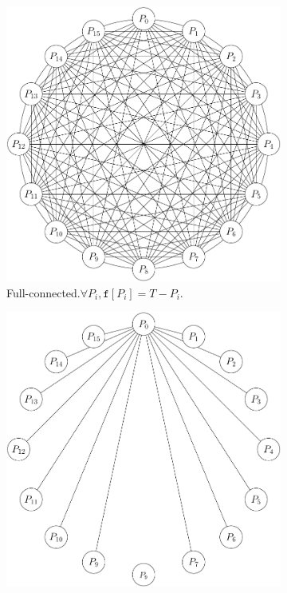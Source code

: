 \begin{figure}
  \centering
  \begin{subfigure}[t]{0.3\textwidth}
    \centering
    \includegraphics[width=\textwidth]{graphics/full-mesh}
    \caption{Full-connected.\newline $\forall P_i, \mathtt{f}[P_i]=T-P_i$.}
    \label{fig:full}
  \end{subfigure}
  \hfill
  \begin{subfigure}[t]{0.3\textwidth}
    \centering
    \includegraphics[width=\textwidth]{graphics/star}

\end{subfigure}
\end{figure}
